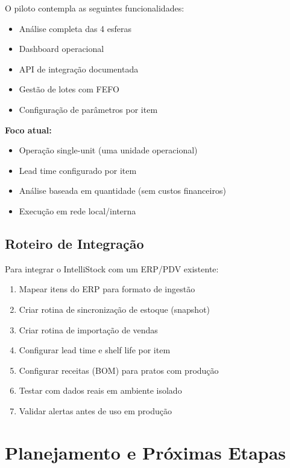 O piloto contempla as seguintes funcionalidades:

\begin{itemize}[leftmargin=2em]
  \item Análise completa das 4 esferas
  \item Dashboard operacional
  \item API de integração documentada
  \item Gestão de lotes com FEFO
  \item Configuração de parâmetros por item
\end{itemize}

\textbf{Foco atual:}

\begin{itemize}[leftmargin=2em]
  \item Operação single-unit (uma unidade operacional)
  \item Lead time configurado por item
  \item Análise baseada em quantidade (sem custos financeiros)
  \item Execução em rede local/interna
\end{itemize}

\subsection{Roteiro de Integração}

Para integrar o IntelliStock com um ERP/PDV existente:

\begin{enumerate}[leftmargin=2em]
  \item Mapear itens do ERP para formato de ingestão
  \item Criar rotina de sincronização de estoque (snapshot)
  \item Criar rotina de importação de vendas
  \item Configurar lead time e shelf life por item
  \item Configurar receitas (BOM) para pratos com produção
  \item Testar com dados reais em ambiente isolado
  \item Validar alertas antes de uso em produção
\end{enumerate}

\newpage
\section{Planejamento e Próximas Etapas}

